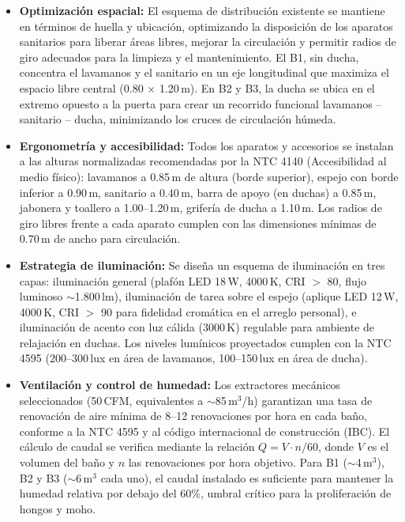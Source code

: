 ﻿\documentclass[12pt]{article}
\begin{document}
\begin{itemize}[noitemsep]
  \item {\bfseries Optimización espacial:} El esquema de distribución existente se
  mantiene en términos de huella y ubicación, optimizando la disposición de los
  aparatos sanitarios para liberar áreas libres, mejorar la circulación y permitir
  radios de giro adecuados para la limpieza y el mantenimiento. El B1, sin ducha,
  concentra el lavamanos y el sanitario en un eje longitudinal que maximiza el
  espacio libre central (0.80 $\times$ 1.20\,m). En B2 y B3, la ducha se ubica
  en el extremo opuesto a la puerta para crear un recorrido funcional lavamanos
  -- sanitario -- ducha, minimizando los cruces de circulación húmeda.
  \item {\bfseries Ergonometría y accesibilidad:} Todos los aparatos y accesorios
  se instalan a las alturas normalizadas recomendadas por la NTC 4140
  (Accesibilidad al medio físico): lavamanos a 0.85\,m de altura (borde superior),
  espejo con borde inferior a 0.90\,m, sanitario a 0.40\,m, barra de apoyo
  (en duchas) a 0.85\,m, jabonera y toallero a 1.00--1.20\,m, grifería de ducha
  a 1.10\,m. Los radios de giro libres frente a cada aparato cumplen con las
  dimensiones mínimas de 0.70\,m de ancho para circulación.
  \item {\bfseries Estrategia de iluminación:} Se diseña un esquema de iluminación
  en tres capas: iluminación general (plafón LED 18\,W, 4000\,K, CRI $>$ 80,
  flujo luminoso $\sim$1.800\,lm), iluminación de tarea sobre el espejo (aplique
  LED 12\,W, 4000\,K, CRI $>$ 90 para fidelidad cromática en el arreglo personal),
  e iluminación de acento con luz cálida (3000\,K) regulable para ambiente de
  relajación en duchas. Los niveles lumínicos proyectados cumplen con la NTC 4595
  (200--300\,lux en área de lavamanos, 100--150\,lux en área de ducha).
  \item {\bfseries Ventilación y control de humedad:} Los extractores mecánicos
  seleccionados (50\,CFM, equivalentes a $\sim$85\,m$^{3}$/h) garantizan una
  tasa de renovación de aire mínima de 8--12 renovaciones por hora en cada baño,
  conforme a la NTC 4595 y al código internacional de construcción (IBC). El
  cálculo de caudal se verifica mediante la relación $Q = V \cdot n / 60$,
  donde $V$ es el volumen del baño y $n$ las renovaciones por hora objetivo.
  Para B1 ($\sim$4\,m$^{3}$), B2 y B3 ($\sim$6\,m$^{3}$ cada uno), el caudal
  instalado es suficiente para mantener la humedad relativa por debajo del 60\%,
  umbral crítico para la proliferación de hongos y moho.

\end{itemize}
\end{document}

